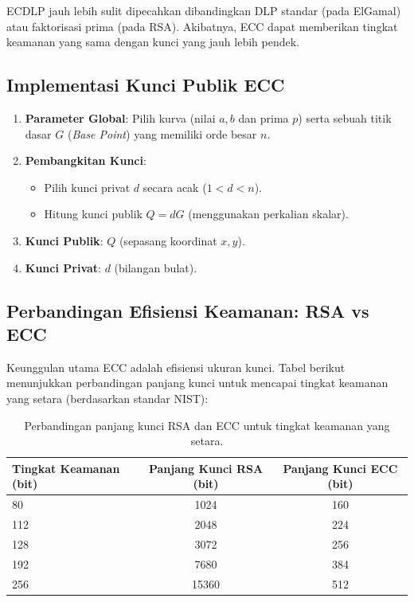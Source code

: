 ECDLP jauh lebih sulit dipecahkan dibandingkan DLP standar (pada ElGamal) atau faktorisasi prima (pada RSA). Akibatnya, ECC dapat memberikan tingkat keamanan yang sama dengan kunci yang jauh lebih pendek.

\subsection{Implementasi Kunci Publik ECC}

\begin{enumerate}
    \item \textbf{Parameter Global}: Pilih kurva (nilai $a, b$ dan prima $p$) serta sebuah titik dasar $G$ (\textit{Base Point}) yang memiliki orde besar $n$.
    \item \textbf{Pembangkitan Kunci}:
    \begin{itemize}
        \item Pilih kunci privat $d$ secara acak ($1 < d < n$).
        \item Hitung kunci publik $Q = dG$ (menggunakan perkalian skalar).
    \end{itemize}
    \item \textbf{Kunci Publik}: $Q$ (sepasang koordinat $x, y$).
    \item \textbf{Kunci Privat}: $d$ (bilangan bulat).
\end{enumerate}

\subsection{Perbandingan Efisiensi Keamanan: RSA vs ECC}

Keunggulan utama ECC adalah efisiensi ukuran kunci. Tabel berikut menunjukkan perbandingan panjang kunci untuk mencapai tingkat keamanan yang setara (berdasarkan standar NIST):

\begin{table}[htbp]
  \centering
  \small
  \begin{tabular}{lcc}
    \toprule
    \textbf{Tingkat Keamanan (bit)} & \textbf{Panjang Kunci RSA (bit)} & \textbf{Panjang Kunci ECC (bit)} \\
    \midrule
    80 & 1024 & 160 \\
    112 & 2048 & 224 \\
    128 & 3072 & 256 \\
    192 & 7680 & 384 \\
    256 & 15360 & 512 \\
    \bottomrule
  \end{tabular}
  \caption{Perbandingan panjang kunci RSA dan ECC untuk tingkat keamanan yang setara.}
  \label{tab:rsa-vs-ecc}
\end{table}

